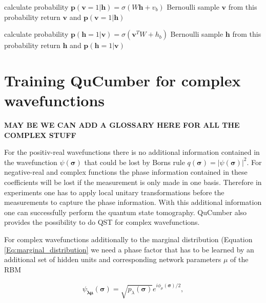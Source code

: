 \documentclass[submission, Phys]{SciPost}
\begin{document}
\begin{algorithm}[H]
	 \caption{calculate $\bm{p}(\bm{v}|\bm{h})$ and sample $\bm{v}$ \textbf{\lstinline{RBM.v_given_h}}() }
  \SetAlgoLined
  calculate probability $\bm{p}(\bm{v} = 1|\bm{h}) = \sigma( W \bm{h} + v_b)$\;
  Bernoulli sample $\bm{v}$ from this probability\;
  return $\bm{v}$ and $\bm{p}(\bm{v} = 1|\bm{h})$\;
 
\end{algorithm}


\begin{algorithm}[H]
	 \caption{calculate $\bm{p}(\bm{h}|\bm{v})$ and sample $\bm{h}$ \textbf{\lstinline{RBM.h_given_v}}() }
  \SetAlgoLined
  calculate probability $\bm{p}(\bm{h} = 1|\bm{v}) = \sigma(\bm{v}^T W  + h_b)$\;
  Bernoulli sample $\bm{h}$ from this probability\;
  return $\bm{h}$ and $\bm{p}(\bm{h} = 1|\bm{v})$\;
 
\end{algorithm}

\section{Training QuCumber for complex wavefunctions}

\textbf{MAY BE WE CAN ADD A GLOSSARY HERE FOR ALL THE COMPLEX STUFF}

For the positiv-real wavefunctions there is no additional information contained in the wavefunction $\psi( \boldsymbol{\sigma})$ that could be lost by Borns rule $q(\boldsymbol{\sigma}) = | \psi( \boldsymbol{\sigma} ) |^2$. For negative-real and complex functions the phase information contained in these coefficients will be lost if the measurement is only made in one basis. Therefore in experiments one has to apply local unitary transformations before the measurements to capture the phase information. With this additional information one can successfully perform the quantum state tomography.
QuCumber also provides the possibility to do QST for complex wavefunctions.

For complex wavefunctions additionally to the marginal distribution (Equation \ref{Eq:marginal_distribution} we need a phase factor that has to be learned by an additional set of hidden units and corresponding network parameters $\mu$ of the RBM

\begin{align}
\psi_{\bm{\lambda} \bm{\mu}} (\bm{\sigma})= \sqrt{p_{\lambda} (\bm{\sigma})} e^{i \phi_{\mu} (\bm{\sigma})/2},
\end{align}
\end{document}
